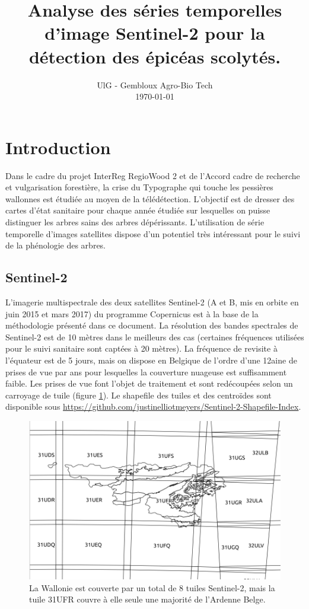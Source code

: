 \documentclass[a4paper, 12pt]{article} %
\title{Analyse des séries temporelles d'image Sentinel-2 pour la détection des épicéas scolytés.}
\date{%
    UlG - Gembloux Agro-Bio Tech
    \\
    \today
}
\begin{document}
\maketitle

\tableofcontents

\section{Introduction}

Dans le cadre du projet InterReg RegioWood 2 et de l'Accord cadre de recherche et vulgarisation forestière, la crise du Typographe qui touche les pessières wallonnes est étudiée au moyen de la télédétection. L'objectif est de dresser des cartes d'état sanitaire pour chaque année étudiée sur lesquelles on puisse distinguer les arbres sains des arbres dépérissants. L'utilisation de série temporelle d'images satellites dispose d'un potentiel très intéressant pour le suivi de la phénologie des arbres.

\subsection{Sentinel-2}

L'imagerie multispectrale des deux satellites Sentinel-2 (A et B, mis en orbite en juin 2015 et mars 2017) du programme Copernicus est à la base de la méthodologie présenté dans ce document. La résolution des bandes spectrales de Sentinel-2 est de 10 mètres dans le meilleurs des cas (certaines fréquences utilisées pour le suivi sanitaire sont captées à 20 mètres). La fréquence de revisite à l'équateur est de 5 jours, mais on dispose en Belgique de l'ordre d'une 12aine de prises de vue par ans pour lesquelles la couverture nuageuse est suffisamment faible. Les prises de vue font l'objet de traitement et sont redécoupées selon un carroyage de tuile (figure \ref{fig:tuileRW}). Le shapefile des tuiles et des centroïdes sont disponible sous \url{https://github.com/justinelliotmeyers/Sentinel-2-Shapefile-Index}.

\begin{figure}[H]
\centering
\includegraphics[width=0.9\linewidth]{../theia_d/tuileS2Nom.png}
\caption{La Wallonie est couverte par un total de 8 tuiles Sentinel-2, mais la tuile 31UFR couvre à elle seule une majorité de l'Ardenne Belge.}
\label{fig:tuileRW}
\end{figure}
\end{document}
